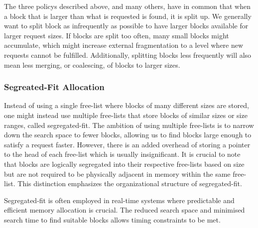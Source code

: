 The three policys described above, and many others, have in common that when a block that is larger than what is requested is found, it is split up. We generally want to split block as infrequently as possible to have larger blocks available for larger request sizes. If blocks are split too often, many small blocks might accumulate, which might increase external fragmentation to a level where new requests cannot be fulfilled. Additionally, splitting blocks less frequently will also mean less merging, or coalescing, of blocks to larger sizes.

\subsubsection{Segreated-Fit Allocation}
Instead of using a single free-list where blocks of many different sizes are stored, one might instead use multiple free-lists that store blocks of similar sizes or size ranges, called segregated-fit. The ambition of using multiple free-lists is to narrow down the search space to fewer blocks, allowing us to find blocks large enough to satisfy a request faster. However, there is an added overhead of storing a pointer to the head of each free-list which is usually insignificant. It is crucial to note that blocks are logically segregated into their respective free-lists based on size but are not required to be physically adjacent in memory within the same free-list. This distinction emphasizes the organizational structure of segregated-fit.

Segregated-fit is often employed in real-time systems where predictable and efficient memory allocation is crucial. The reduced search space and minimised search time to find suitable blocks allows timing constraints to be met.


